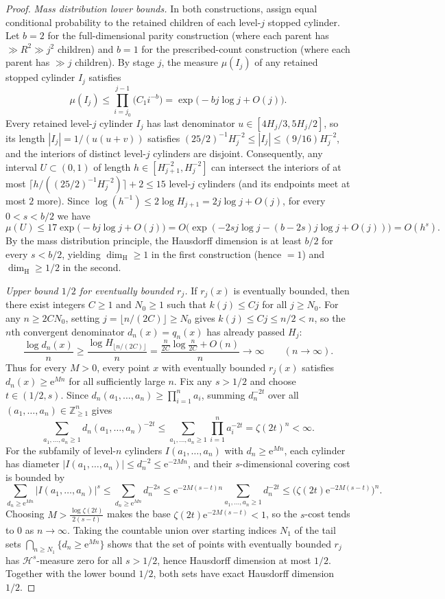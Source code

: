 \documentclass[11pt]{article}
\theoremstyle{definition}
\theoremstyle{remark}
\newcommand{\Z}{\mathbb{Z}}
\newcommand{\ee}{\mathrm{e}}
\newcommand{\dimH}{\dim_{\mathrm{H}}}
\begin{document}
\begin{proof}
\emph{Mass distribution lower bounds.} In both constructions, assign equal
conditional probability to the retained children of each level-$j$ stopped
cylinder. Let $b=2$ for the full-dimensional parity construction (where each
parent has $\gg R^2\gg j^2$ children) and $b=1$ for the prescribed-count
construction (where each parent has $\gg j$ children). By stage $j$, the
measure $\mu(I_j)$ of any retained stopped cylinder $I_j$ satisfies
\[
\mu(I_j)\le\prod_{i=j_0}^{j-1}\bigl(C_1 i^{-b}\bigr)=\exp\bigl(-bj\log j+O(j)\bigr).
\]
Every retained level-$j$ cylinder $I_j$ has last denominator
$u\in[4H_j/3,5H_j/2]$, so its length $|I_j|=1/(u(u+v))$ satisfies
$(25/2)^{-1}H_j^{-2}\le|I_j|\le(9/16)H_j^{-2}$, and the interiors of distinct
level-$j$ cylinders are disjoint. Consequently, any interval $U\subset(0,1)$ of
length $h\in[H_{j+1}^{-2},H_j^{-2}]$ can intersect the interiors of at most
$\lceil h/((25/2)^{-1}H_j^{-2})\rceil+2\le 15$ level-$j$ cylinders (and its
endpoints meet at most $2$ more). Since
$\log(h^{-1})\le2\log H_{j+1}=2j\log j+O(j)$, for every $0<s<b/2$ we have
\[
\mu(U)\le 17\exp\bigl(-bj\log j+O(j)\bigr)
=O\bigl(\exp(-2s j\log j- (b-2s)j\log j+O(j))\bigr)=O(h^s).
\]
By the mass distribution principle, the Hausdorff dimension is at least $b/2$
 for every $s<b/2$, yielding $\dimH\ge1$ in the first construction (hence $=1$)
and $\dimH\ge1/2$ in the second.

\emph{Upper bound $1/2$ for eventually bounded $r_j$.} If $r_j(x)$ is
eventually bounded, then there exist integers $C\ge1$ and $N_0\ge1$ such that
$k(j)\le Cj$ for all $j\ge N_0$. For any $n\ge2CN_0$, setting
$j=\lfloor n/(2C)\rfloor\ge N_0$ gives $k(j)\le Cj\le n/2<n$, so the $n$th
convergent denominator $d_n(x)=q_n(x)$ has already passed $H_j$:
\[
\frac{\log d_n(x)}{n}\ge\frac{\log H_{\lfloor n/(2C)\rfloor}}{n}
=\frac{\frac{n}{2C}\log\frac{n}{2C}+O(n)}{n}\longrightarrow\infty
\qquad(n\to\infty).
\]
Thus for every $M>0$, every point $x$ with eventually bounded $r_j(x)$ satisfies
$d_n(x)\ge\ee^{Mn}$ for all sufficiently large $n$. Fix any $s>1/2$ and choose
$t\in(1/2,s)$. Since $d_n(a_1,\dots,a_n)\ge\prod_{i=1}^n a_i$, summing
$d_n^{-2t}$ over all $(a_1,\dots,a_n)\in\Z_{\ge1}^n$ gives
\[
\sum_{a_1,\dots,a_n\ge1} d_n(a_1,\dots,a_n)^{-2t}
\le\sum_{a_1,\dots,a_n\ge1}\prod_{i=1}^n a_i^{-2t}=\zeta(2t)^n<\infty.
\]
For the subfamily of level-$n$ cylinders $I(a_1,\dots,a_n)$ with
$d_n\ge\ee^{Mn}$, each cylinder has diameter
$|I(a_1,\dots,a_n)|\le d_n^{-2}\le\ee^{-2Mn}$, and their $s$-dimensional
covering cost is bounded by
\[
\sum_{d_n\ge\ee^{Mn}}\bigl|I(a_1,\dots,a_n)\bigr|^s
\le\sum_{d_n\ge\ee^{Mn}} d_n^{-2s}
\le\ee^{-2M(s-t)n}\sum_{a_1,\dots,a_n\ge1} d_n^{-2t}
\le\bigl(\zeta(2t)\ee^{-2M(s-t)}\bigr)^n.
\]
Choosing $M>\frac{\log\zeta(2t)}{2(s-t)}$ makes the base
$\zeta(2t)\ee^{-2M(s-t)}<1$, so the $s$-cost tends to $0$ as $n\to\infty$.
Taking the countable union over starting indices $N_1$ of the tail sets
$\bigcap_{n\ge N_1}\{d_n\ge\ee^{Mn}\}$ shows that the set of points with
eventually bounded $r_j$ has $\mathcal H^s$-measure zero for all $s>1/2$, hence
Hausdorff dimension at most $1/2$. Together with the lower bound $1/2$, both
sets have exact Hausdorff dimension $1/2$.
\end{proof}
\end{document}
